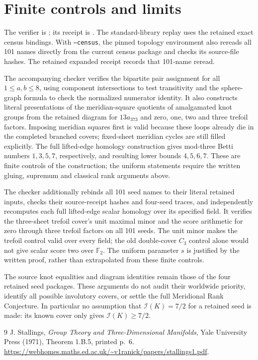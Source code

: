 \documentclass[11pt]{article}
\newcommand{\I}{\mathcal I}
\newcommand{\F}{\mathbb F}
\begin{document}
\section{Finite controls and limits}

The verifier is ; its receipt is
.
The standard-library replay uses the retained exact census bindings.
With \texttt{--census}, the pinned topology environment also rereads
all 101 names directly from the current census package and checks
its source-file hashes. The retained expanded receipt records that
101-name reread.

The accompanying checker verifies the bipartite pair assignment for
all $1\le a,b\le8$, using component intersections to test
transitivity and the sphere-graph formula to check the normalized
numerator identity. It also constructs literal presentations of the meridian-square
quotients of amalgamated knot groups from the retained diagram for
$13a_{373}$ and zero, one, two and three trefoil factors. Imposing
meridian squares first is valid because these loops already die in
the completed branched covers; fixed-sheet meridian cycles are still
filled explicitly. The full lifted-edge
homology construction gives mod-three Betti numbers $1,3,5,7$,
respectively, and resulting lower bounds $4,5,6,7$. These are finite
controls of the construction; the uniform statements require the
written gluing, supremum and classical rank arguments above.

The checker additionally rebinds all 101 seed names to their literal
retained inputs, checks their source-receipt hashes and four-seed
traces, and independently recomputes each full lifted-edge scalar
homology over its specified field. It verifies the three-sheet trefoil
cover's unit maximal minor and the score arithmetic for zero through
three trefoil factors on all 101 seeds. The unit minor makes the
trefoil control valid over every field; the old double-cover $C_3$
control alone would not give scalar score two over $\F_2$.
The uniform parameter $s$ is justified by the written proof, rather
than extrapolated from these finite controls.

The source knot equalities and diagram identities remain those of the
four retained seed packages. These arguments do not audit their
worldwide priority, identify all possible involutory covers, or settle
the full Meridional Rank Conjecture. In particular no assumption that
$\I(K)=7/2$ for a retained seed is made: its known cover only gives
$\I(K)\ge7/2$.

\begin{thebibliography}{9}
 J. Stallings, \emph{Group Theory and
Three-Dimensional Manifolds}, Yale University Press (1971),
Theorem 1.B.5, printed p.~6.
\url{https://webhomes.maths.ed.ac.uk/~v1ranick/papers/stallings1.pdf}.
\end{thebibliography}
\end{document}
